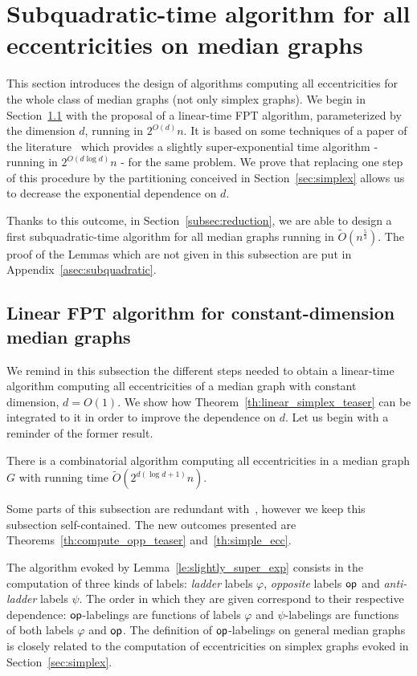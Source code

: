 \documentclass[a4paper,UKenglish,numberwithinsect,cleveref, autoref]{lipics-v2021}
\newcommand{\opp}{\mbox{\textsf{op}}}
\begin{document}
\section{Subquadratic-time algorithm for all eccentricities on median graphs} \label{sec:subquadratic}

This section introduces the design of algorithms computing all eccentricities for the whole class of  median graphs (not only simplex graphs). We begin in Section~\ref{subsec:constant_dim} with the proposal of a linear-time FPT algorithm, parameterized by the dimension $d$, running in $2^{O(d)}n$. It is based on some techniques of a paper of the literature~\cite{BeHa21} which provides a slightly super-exponential time algorithm - running in $2^{O(d\log d)}n$ - for the same problem. We prove that replacing one step of this procedure by the partitioning conceived in Section~\ref{sec:simplex} allows us to decrease the exponential dependence on $d$.

Thanks to this outcome, in Section~\ref{subsec:reduction}, we are able to design a first subquadratic-time algorithm for all median graphs running in $\tilde{O}(n^{\frac{5}{3}})$. The proof of the Lemmas which are not given in this subsection are put in Appendix~\ref{asec:subquadratic}. 

\subsection{Linear FPT algorithm for constant-dimension median graphs} \label{subsec:constant_dim}

We remind in this subsection the different steps needed to obtain a linear-time algorithm computing all eccentricities of a median graph with constant dimension, $d=O(1)$. We show how Theorem~\ref{th:linear_simplex_teaser} can be integrated to it in order to improve the dependence on $d$. Let us begin with a reminder of the former result.

\begin{lemma}
There is a combinatorial algorithm computing all eccentricities in a median graph $G$ with running time $\tilde{O}(2^{d(\log d + 1)}n)$.
\label{le:slightly_super_exp}
\end{lemma}

Some parts of this subsection are redundant with~\cite{BeHa21}, however we keep this subsection self-contained. The new outcomes presented are Theorems~\ref{th:compute_opp_teaser} and~\ref{th:simple_ecc}.

The algorithm evoked by Lemma~\ref{le:slightly_super_exp} consists in the computation of three kinds of labels: \textit{ladder} labels $\varphi$, \textit{opposite} labels $\opp$ and \textit{anti-ladder} labels $\psi$. The order in which they are given correspond to their respective dependence: $\opp$-labelings are functions of labels $\varphi$ and $\psi$-labelings are functions of both labels $\varphi$ and $\opp$.
The definition of $\opp$-labelings on general median graphs is closely related to the computation of eccentricities on simplex graphs evoked in Section~\ref{sec:simplex}.
\end{document}
